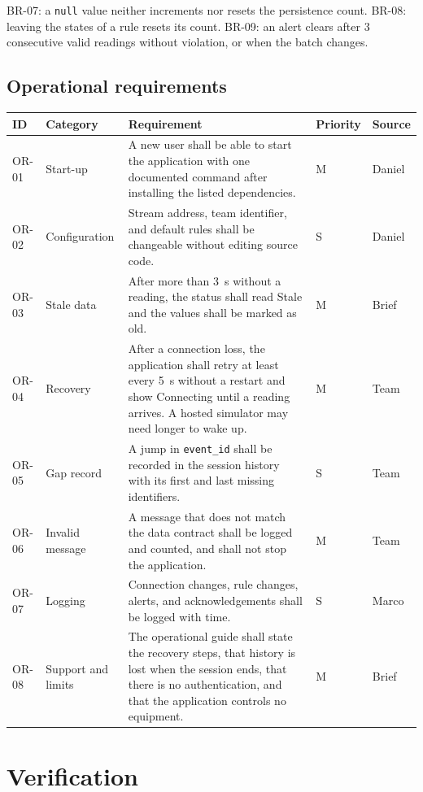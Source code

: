 \documentclass[10pt,a4paper]{article}
\newcommand{\head}[1]{\textbf{\color{courseblue}#1}}
\newcommand{\field}[1]{\texttt{#1}}
\begin{document}
BR-07: a \field{null} value neither increments nor resets the persistence count. BR-08: leaving the states of a rule resets its count. BR-09: an alert clears after 3 consecutive valid readings without violation, or when the batch changes.

\subsection{Operational requirements}
\begin{longtable}{@{}L{14mm}L{24mm}L{79mm}L{14mm}L{17mm}@{}}
\toprule \head{ID} & \head{Category} & \head{Requirement} & \head{Priority} & \head{Source}\\ \midrule \endhead
OR-01 & Start-up & A new user shall be able to start the application with one documented command after installing the listed dependencies. & M & Daniel\\
OR-02 & Configuration & Stream address, team identifier, and default rules shall be changeable without editing source code. & S & Daniel\\
OR-03 & Stale data & After more than 3~s without a reading, the status shall read Stale and the values shall be marked as old. & M & Brief\\
OR-04 & Recovery & After a connection loss, the application shall retry at least every 5~s without a restart and show Connecting until a reading arrives. A hosted simulator may need longer to wake up. & M & Team\\
OR-05 & Gap record & A jump in \field{event\_id} shall be recorded in the session history with its first and last missing identifiers. & S & Team\\
OR-06 & Invalid message & A message that does not match the data contract shall be logged and counted, and shall not stop the application. & M & Team\\
OR-07 & Logging & Connection changes, rule changes, alerts, and acknowledgements shall be logged with time. & S & Marco\\
OR-08 & Support and limits & The operational guide shall state the recovery steps, that history is lost when the session ends, that there is no authentication, and that the application controls no equipment. & M & Brief\\
\bottomrule
\end{longtable}

\newpage
\section{Verification}\label{sec:ver}
\end{document}
